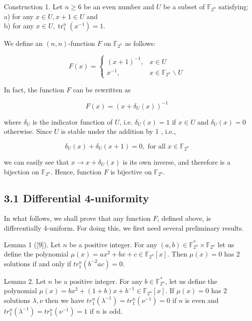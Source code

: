 \documentclass[10pt]{article}
\begin{document}
Construction 1. Let $n \geq 6$ be an even number and $U$ be a subset of $\mathbb{F}_{2^{n}}$ satisfying:\\
a) for any $x \in U, x+1 \in U$ and\\
b) for any $x \in U, \operatorname{tr}_{1}^{n}\left(x^{-1}\right)=1$.

We define an $(n, n)$-function $F$ on $\mathbb{F}_{2^{n}}$ as follows:

$$
F(x)= \begin{cases}(x+1)^{-1}, & x \in U \\ x^{-1}, & x \in \mathbb{F}_{2^{n}} \backslash U\end{cases}
$$

In fact, the function $F$ can be rewritten as


\begin{equation*}
F(x)=\left(x+\delta_{U}(x)\right)^{-1} \tag{1}
\end{equation*}


where $\delta_{U}$ is the indicator function of $U$, i.e. $\delta_{U}(x)=1$ if $x \in U$ and $\delta_{U}(x)=0$ otherwise. Since $U$ is stable under the addition by 1 , i.e.,

$$
\delta_{U}(x)+\delta_{U}(x+1)=0, \text { for all } x \in \mathbb{F}_{2^{n}}
$$

we can easily see that $x \rightarrow x+\delta_{U}(x)$ is its own inverse, and therefore is a bijection on $\mathbb{F}_{2^{n}}$. Hence, function $F$ is bijective on $\mathbb{F}_{2^{n}}$.

\subsection*{3.1 Differential 4-uniformity}
In what follows, we shall prove that any function $F$, defined above, is differentially 4-uniform. For doing this, we first need several preliminary results.

Lemma 1 ([9]). Let $n$ be a positive integer. For any $(a, b) \in \mathbb{F}_{2^{n}}^{*} \times \mathbb{F}_{2^{n}}$ let us define the polynomial $\mu(x)=a x^{2}+b x+c \in \mathbb{F}_{2^{n}}[x]$. Then $\mu(x)=0$ has 2 solutions if and only if $t r_{1}^{n}\left(b^{-2} a c\right)=0$.

Lemma 2. Let $n$ be a positive integer. For any $b \in \mathbb{F}_{2^{n}}^{*}$, let us define the polynomial $\mu(x)=b x^{2}+(1+b) x+b^{-1} \in \mathbb{F}_{2^{n}}[x]$. If $\mu(x)=0$ has 2 solutions $\lambda, \nu$ then we have $t r_{1}^{n}\left(\lambda^{-1}\right)=t r_{1}^{n}\left(\nu^{-1}\right)=0$ if $n$ is even and $t r_{1}^{n}\left(\lambda^{-1}\right)=t r_{1}^{n}\left(\nu^{-1}\right)=1$ if $n$ is odd.
\end{document}
